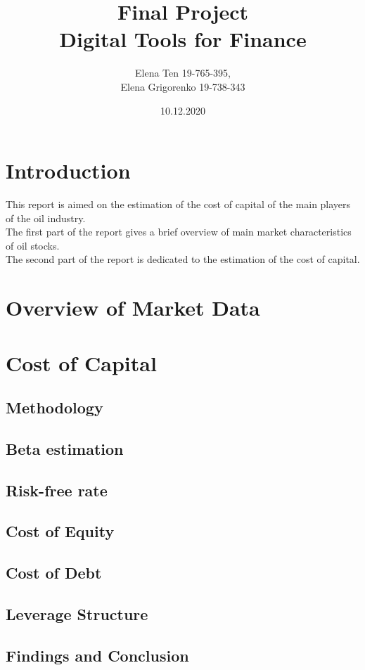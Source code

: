 \documentclass [a4paper, 11pt] {article}
\begin{document}
\title {\Huge Final Project \\
 \Huge Digital Tools for Finance }
\author {\huge Elena Ten 19-765-395, \\
	 	 \huge Elena Grigorenko 19-738-343}

\date {\huge 10.12.2020}

\maketitle
\thispagestyle{empty}
\newpage

\section *{Introduction}
This report is aimed on the estimation of the cost of capital of the main players of the oil industry.\\
The first part of the report gives a brief overview of main market characteristics of oil stocks.\\
The second part of the report is dedicated to the estimation of the cost of capital.

\section *{Overview of Market Data}

\section *{Cost of Capital}
\subsection *{Methodology}
\subsection *{Beta estimation}
\subsection *{Risk-free rate}
\subsection *{Cost of Equity}
\subsection *{Cost of Debt}
\subsection *{Leverage Structure}
\subsection *{Findings and Conclusion}
\end{document}
